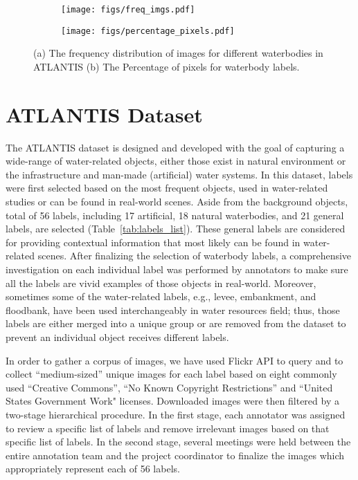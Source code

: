 \documentclass{article}
\begin{document}
\begin{figure}[htbp]
     \centering
     \begin{subfigure}[b]{0.9\textwidth}
         \centering
         \texttt{[image: figs/freq\_imgs.pdf]}
         \vspace{-0.5em}
         \caption{}
         \label{sfig:freq-imgs}
     \end{subfigure}
\begin{subfigure}[b]{0.9\textwidth}
         \centering
         \texttt{[image: figs/percentage\_pixels.pdf]}
         \vspace{-0.5em}
         \caption{}
         \label{sfig:percentage-pixels}
     \end{subfigure}
     \vspace{-0.5em}
        \caption{(a) The frequency distribution of images for different waterbodies in ATLANTIS (b) The Percentage of pixels for waterbody labels.}
        \label{fig:freq-imgs-pixels}
\end{figure}

\section{ATLANTIS Dataset} \label{sec:dataset}
The ATLANTIS dataset is designed and developed with the goal of capturing a wide-range of water-related objects, either those exist in natural environment or the infrastructure and man-made (artificial) water systems. In this dataset, labels were first selected based on the most frequent objects, used in water-related studies or can be found in real-world scenes. Aside from the background objects, total of 56 labels, including 17 artificial, 18 natural waterbodies, and 21 general labels, are selected (Table~\ref{tab:labels_list}). These general labels are considered for providing contextual information that most likely can be found in water-related scenes. After finalizing the selection of waterbody labels, a comprehensive investigation on each individual label was performed by annotators to make sure all the labels are vivid examples of those objects in real-world. Moreover, sometimes some of the water-related labels, e.g., levee, embankment, and floodbank, have been used interchangeably in water resources field; thus, those labels are either merged into a unique group or are removed from the dataset to prevent an individual object receives different labels.

In order to gather a corpus of images, we have used Flickr API to query and to collect ``medium-sized'' unique images for each label based on eight commonly used ``Creative Commons'', ``No Known Copyright Restrictions'' and ``United States Government Work" licenses. Downloaded images were then filtered by a two-stage hierarchical procedure. In the first stage, each annotator was assigned to review a specific list of labels and remove irrelevant images based on that specific list of labels. In the second stage, several meetings were held between the entire annotation team and the project coordinator to finalize the images which appropriately represent each of 56 labels.
\end{document}
